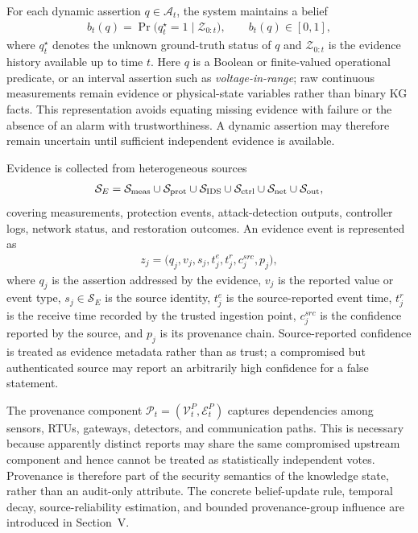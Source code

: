 For each dynamic assertion $q\in\mathcal{A}_t$, the system maintains a belief
\begin{align}
\label{eq-fact-belief}
b_t(q)=\Pr\big(q_t^{\star}=1\mid \mathcal{Z}_{0:t}\big),\qquad b_t(q)\in[0,1],
\end{align}
where $q_t^{\star}$ denotes the unknown ground-truth status of $q$ and $\mathcal{Z}_{0:t}$ is the evidence history available up to time $t$. Here $q$ is a Boolean or finite-valued operational predicate, or an interval assertion such as \emph{voltage-in-range}; raw continuous measurements remain evidence or physical-state variables rather than binary KG facts. This representation avoids equating missing evidence with failure or the absence of an alarm with trustworthiness. A dynamic assertion may therefore remain uncertain until sufficient independent evidence is available.

Evidence is collected from heterogeneous sources
\begin{align}
\mathcal{S}_{E}=
\mathcal{S}_{\rm meas}\cup
\mathcal{S}_{\rm prot}\cup
\mathcal{S}_{\rm IDS}\cup
\mathcal{S}_{\rm ctrl}\cup
\mathcal{S}_{\rm net}\cup
\mathcal{S}_{\rm out},
\end{align}
covering measurements, protection events, attack-detection outputs, controller logs, network status, and restoration outcomes. An evidence event is represented as
\begin{align}
\label{eq-evidence-event}
z_j=\big(q_j,v_j,s_j,t^{e}_j,t^{r}_j,c^{src}_j,p_j\big),
\end{align}
where $q_j$ is the assertion addressed by the evidence, $v_j$ is the reported value or event type, $s_j\in\mathcal{S}_E$ is the source identity, $t^{e}_j$ is the source-reported event time, $t^{r}_j$ is the receive time recorded by the trusted ingestion point, $c^{src}_j$ is the confidence reported by the source, and $p_j$ is its provenance chain. Source-reported confidence is treated as evidence metadata rather than as trust; a compromised but authenticated source may report an arbitrarily high confidence for a false statement.

The provenance component $\mathcal{P}_t=(\mathcal{V}^{P}_t,\mathcal{E}^{P}_t)$ captures dependencies among sensors, RTUs, gateways, detectors, and communication paths. This is necessary because apparently distinct reports may share the same compromised upstream component and hence cannot be treated as statistically independent votes. Provenance is therefore part of the security semantics of the knowledge state, rather than an audit-only attribute. The concrete belief-update rule, temporal decay, source-reliability estimation, and bounded provenance-group influence are introduced in Section~V.

